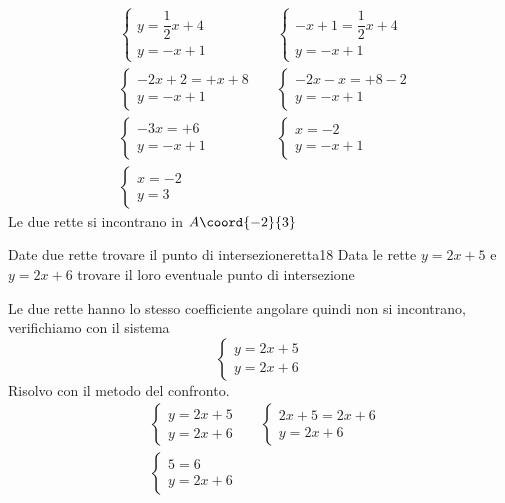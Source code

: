 \begin{align*}
	&\begin{cases} 
		y=\dfrac{1}{2}x+4\\
		y=-x+1
	\end{cases}&&\begin{cases} 
	-x+1=\dfrac{1}{2}x+4\\
	y=-x+1
\end{cases}\\
&\begin{cases} 
	-2x+2=+x+8\\
	y=-x+1
\end{cases}&&\begin{cases} 
-2x-x=+8-2\\
y=-x+1
\end{cases}\\
&\begin{cases} 
	-3x=+6\\
	y=-x+1
\end{cases}&&
\begin{cases} 
	x=-2\\
	y=-x+1
\end{cases}\\
&\begin{cases} 
	x=-2\\
	y=3
\end{cases}
\end{align*}
Le due rette si incontrano in $A\coord{-2}{3}$
\begin{cesempiot}{Date due rette trovare il punto di intersezione}{retta18}
	Data le rette $y=2x+5$ e $y=2x+6$ trovare il loro eventuale punto di intersezione
\end{cesempiot}
Le due rette hanno lo stesso coefficiente angolare quindi non si incontrano, verifichiamo con il sistema 
\[\begin{cases} 
y=2x+5\\
y=2x+6
\end{cases}\]
Risolvo con il metodo del confronto.
\begin{align*}
	&\begin{cases} 
		y=2x+5\\
		y=2x+6
	\end{cases}&&\begin{cases} 
	2x+5=2x+6\\
	y=2x+6
\end{cases}\\
&\begin{cases} 
	5=6\\
	y=2x+6
\end{cases}
\end{align*}
